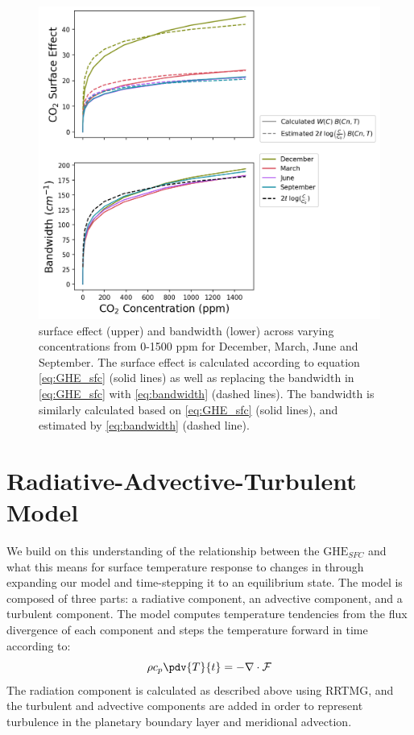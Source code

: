 \documentclass[draft]{agujournal2019}
\begin{document}
\begin{figure}[htb!]
\noindent\includegraphics[width=1\textwidth]{figures/sfc_bandwidth_and_co2.png}
\centering
\caption{ surface effect (upper) and bandwidth (lower) across varying  concentrations from 0-1500 ppm for December, March, June and September. The  surface effect is calculated according to equation \ref{eq:GHE_sfc} (solid lines) as well as replacing the bandwidth in \ref{eq:GHE_sfc} with \ref{eq:bandwidth} (dashed lines). The bandwidth is similarly calculated based on \ref{eq:GHE_sfc} (solid lines), and estimated by \ref{eq:bandwidth} (dashed line).}
\label{fig:sfc_bandwidth_co2}
\end{figure}


\section{Radiative-Advective-Turbulent Model}

We build on this understanding of the relationship between the ${\text{GHE}_{SFC}}$ and what this means for surface temperature response to changes in  through expanding our model and time-stepping it to an equilibrium state. The model is composed of three parts: a radiative component, an advective component, and a turbulent component. The model computes temperature tendencies from the flux divergence of each component and steps the temperature forward in time according to:
\begin{equation}
    \rho c_{p} \pdv{T}{t} = -\nabla \cdot \mathbf{\mathcal{F}}
\end{equation}
The radiation component is calculated as described above using RRTMG, and the turbulent and advective components are added in order to represent turbulence in the planetary boundary layer and meridional advection. 
\end{document}
